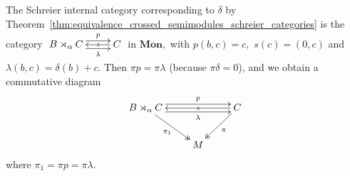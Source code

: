 \documentclass[a4paper]{amsart}
\theoremstyle{plain}
\theoremstyle{definition}
\theoremstyle{remark}
\begin{document}
The Schreier internal category corresponding to $\delta$ by Theorem~\ref{thm:equivalence_crossed_semimodules_schreier_categories} is the category $\xymatrix{{B\rtimes_{\alpha} C} \ar@<.9ex>[r]^-{p} \ar@<-.9ex>[r]_-{\lambda} &{C} \ar[l]|-s}$ in $\mathbf{Mon},$ with $p(b,c)=c,$ $s(c)=(0,c)$ and $\lambda(b,c)=\delta(b)+c.$ Then $\pi p=\pi\lambda$ (because $\pi\delta=0$), and we obtain a commutative diagram
\begin{equation}
\label{eqn:associated_category}
\begin{aligned}
\xymatrix{
{B\rtimes_{\alpha}C} \ar@{->>}[rd]_-{\pi_1} \ar@<.9ex>[rr]^-{p} \ar@<-.9ex>[rr]_-{\lambda} &\ &{C} \ar@{->>}[ld]^-{\pi} \ar[ll]|-{s} \\
&{M}
}
\end{aligned}
\end{equation}
where $\pi_1=\pi p=\pi\lambda.$
\end{document}
